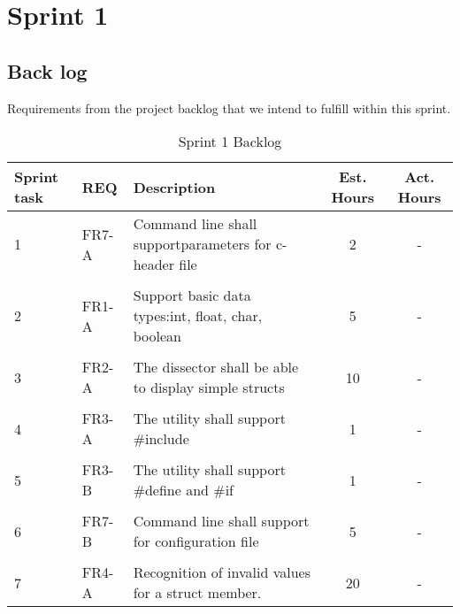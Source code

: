 \chapter{Sprint 1}

\section{Back log}
Requirements from the project backlog that we intend to fulfill within this sprint.

\begin{table}[ht] \center
\caption{Sprint 1 Backlog}

\begin{tabular}{p{1cm} p{1cm} p{6cm} c  c}
	Sprint task & REQ & Description & Est. Hours & Act. Hours \\
	\hline
	1 & FR7-A & Command line shall support\newline parameters for c-header file & 2 & -\\
	 & & &  & \\
	2 & FR1-A & Support basic data types:\newline int, float, char, boolean & 5 & -\\	
	 & & &  & \\
	3 & FR2-A & The dissector shall be able to display simple structs & 10 & -\\
	 & & &  & \\
	4 & FR3-A & The utility shall support \#include & 1 & -\\
	 & & &  & \\
	5 & FR3-B & The utility shall support \#define and \#if & 1 & -\\	
	 & & &  & \\
	6 & FR7-B & Command line shall support for configuration file & 5 & -\\
	 & & &  & \\
	7 & FR4-A & Recognition of invalid values for a struct member. & 20 & -\\
\end{tabular}
\end{table}

